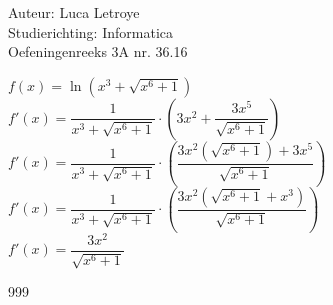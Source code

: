 \documentclass[a4paper]{article}
\begin{document}
  
\noindent \large Auteur: Luca Letroye        \\
\noindent \large Studierichting: Informatica \\
\noindent \large Oefeningenreeks 3A nr. 36.16 \\

\medskip

\normalsize

$f(x) = \ln(x^3+\sqrt{x^6+1})$\\

$f'(x) = \dfrac{1}{x^3+\sqrt{x^6+1}}\cdot \left(3x^2 + \dfrac{3x^5}{\sqrt{x^6+1}} \right)$\\

$f'(x) = \dfrac{1}{x^3+\sqrt{x^6+1}}\cdot \left( \dfrac{3x^2(\sqrt{x^6+1}) +3x^5}{\sqrt{x^6+1}} \right)$\\

$f'(x) = \dfrac{1}{x^3+\sqrt{x^6+1}}\cdot \left( \dfrac{3x^2(\sqrt{x^6+1}+x^3)}{\sqrt{x^6+1}} \right)$\\

$f'(x) = \dfrac{3x^2}{\sqrt{x^6+1}}$\\


\begin{thebibliography}{999}
\end{thebibliography}
\end{document}

